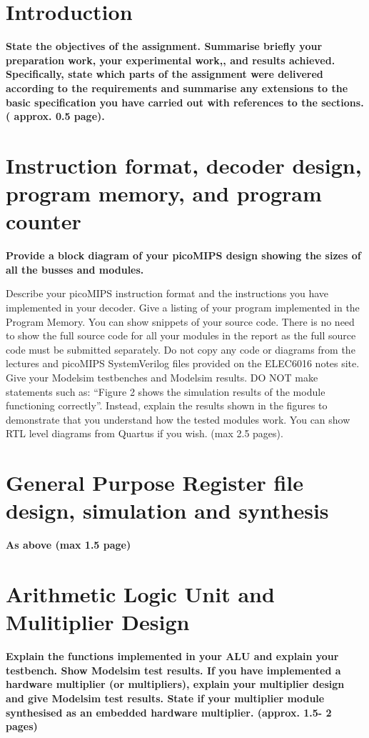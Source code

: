 \section{Introduction}

{
	\color{red} \bfseries
	State the objectives of the assignment. Summarise briefly your preparation work,  your experimental work,, and results achieved. Specifically, state which parts of the assignment were delivered according to the requirements and summarise any extensions to the basic specification you have carried out with references to the sections.  ( approx. 0.5 page).
}

\section{Instruction format, decoder design, program memory, and program counter}

{
	\color{red} \bfseries
	Provide a block diagram of your picoMIPS design showing the sizes of all the busses and modules.
	
	Describe your picoMIPS instruction format and the instructions you have implemented in your decoder. Give a listing of your program implemented in the Program Memory. You can show snippets of your source code. There is no need to show the full source code for all your modules in the report as the full source code must be submitted separately.  Do not copy any code or diagrams from the lectures and picoMIPS SystemVerilog files provided on the ELEC6016 notes site. Give your Modelsim testbenches and Modelsim results.  DO NOT make statements such as: “Figure 2 shows the simulation results of the module functioning correctly”.  Instead, explain the results shown in the figures to demonstrate that you understand how the tested modules work.  You can show RTL level diagrams from Quartus if you wish. (max 2.5 pages).
}

\section{General Purpose Register file design, simulation and synthesis}

{
	\color{red} \bfseries
	As above (max 1.5 page)
}

\section{Arithmetic Logic Unit and Mulitiplier Design}

{
	\color{red} \bfseries
	 Explain the functions implemented in  your ALU and explain your testbench. Show Modelsim test results.  If you have implemented a hardware multiplier (or multipliers), explain your multiplier design and give Modelsim test results. State if your multiplier module synthesised as an embedded hardware multiplier.  (approx. 1.5- 2 pages)
}

